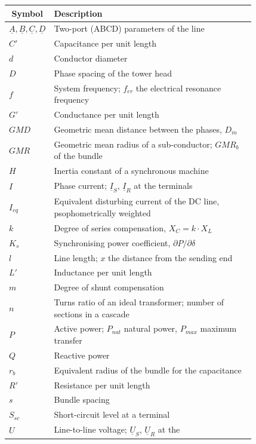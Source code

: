 \begin{longtable}{@{}l p{0.82\linewidth}@{}}
  \toprule
  \multicolumn{1}{c}{\textbf{Symbol}} & \textbf{Description} \\
  \midrule
  \endhead
  $\underline{A}, \underline{B}, \underline{C}, \underline{D}$
          & Two-port (ABCD) parameters of the line \\
  $C'$    & Capacitance per unit length \\
  $d$     & Conductor diameter \\
  $D$     & Phase spacing of the tower head \\
  $f$     & System frequency; $f_{er}$ the electrical resonance frequency \\
  $G'$    & Conductance per unit length \\
  $GMD$   & Geometric mean distance between the phases, $D_m$ \\
  $GMR$   & Geometric mean radius of a sub-conductor; $GMR_b$ of the bundle \\
  $H$     & Inertia constant of a synchronous machine \\
  $I$     & Phase current; $\underline{I}_S$, $\underline{I}_R$ at the terminals \\
  $I_{eq}$ & Equivalent disturbing current of the DC line, psophometrically weighted \\
  $k$     & Degree of series compensation, $X_C = k \cdot X_L$ \\
  $K_s$   & Synchronising power coefficient, $\partial P / \partial \delta$ \\
  $l$     & Line length; $x$ the distance from the sending end \\
  $L'$    & Inductance per unit length \\
  $m$     & Degree of shunt compensation \\
  $n$     & Turns ratio of an ideal transformer; number of sections in a cascade \\
  $P$     & Active power; $P_{nat}$ natural power, $P_{max}$ maximum transfer \\
  $Q$     & Reactive power \\
  $r_b$   & Equivalent radius of the bundle for the capacitance \\
  $R'$    & Resistance per unit length \\
  $s$     & Bundle spacing \\
  $S_{sc}$ & Short-circuit level at a terminal \\
  $U$     & Line-to-line voltage; $\underline{U}_S$, $\underline{U}_R$ at the

\end{longtable}
